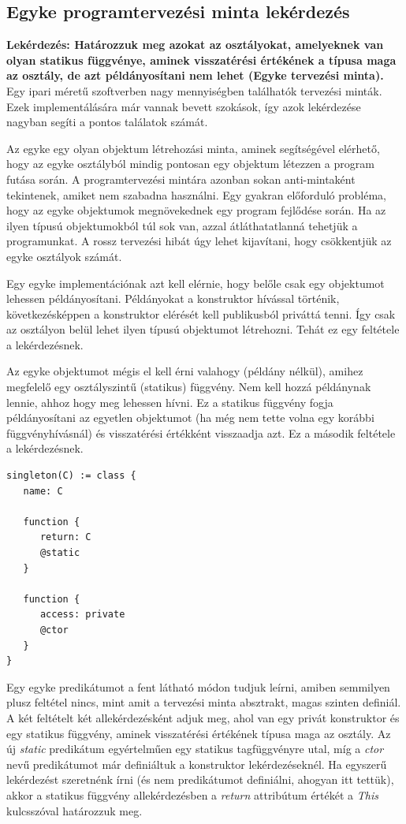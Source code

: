 \documentclass[a4paper,12pt]{report}
\begin{document}
\subsection{Egyke programtervezési minta lekérdezés}
\textbf{Lekérdezés: Határozzuk meg azokat az osztályokat, amelyeknek van olyan statikus függvénye, aminek visszatérési értékének a típusa maga az osztály, de azt példányosítani nem lehet (Egyke tervezési minta).}
\\
Egy ipari méretű szoftverben nagy mennyiségben találhatók tervezési minták. Ezek implementálására már vannak bevett szokások, így azok lekérdezése nagyban segíti a pontos találatok számát.
\par Az egyke egy olyan objektum létrehozási minta, aminek segítségével elérhető, hogy az egyke osztályból mindig pontosan egy objektum létezzen a program futása során. A programtervezési mintára azonban sokan anti-mintaként tekintenek, amiket nem szabadna használni. Egy gyakran előforduló probléma, hogy az egyke objektumok megnövekednek egy program fejlődése során. Ha az ilyen típusú objektumokból túl sok van, azzal átláthatatlanná tehetjük a programunkat. A rossz tervezési hibát úgy lehet kijavítani, hogy csökkentjük az egyke osztályok számát.
\par Egy egyke implementációnak azt kell elérnie, hogy belőle csak egy objektumot lehessen példányosítani. Példányokat a konstruktor hívással történik, következésképpen a konstruktor elérését kell publikusból priváttá tenni. Így csak az osztályon belül lehet ilyen típusú objektumot létrehozni. Tehát ez egy feltétele a lekérdezésnek.
\par Az egyke objektumot mégis el kell érni valahogy (példány nélkül), amihez megfelelő egy osztályszintű (statikus) függvény. Nem kell hozzá példánynak lennie, ahhoz hogy meg lehessen hívni. Ez a statikus függvény fogja példányosítani az egyetlen objektumot (ha még nem tette volna egy korábbi függvényhívásnál) és visszatérési értékként visszaadja azt. Ez a második feltétele a lekérdezésnek.
\begin{verbatim}
singleton(C) := class {
   name: C
   
   function {
      return: C
      @static
   }

   function {
      access: private 
      @ctor      
   }
}
\end{verbatim}
\par Egy egyke predikátumot a fent látható módon tudjuk leírni, amiben semmilyen plusz feltétel nincs, mint amit a tervezési minta absztrakt, magas szinten definiál. A két feltételt két allekérdezésként adjuk meg, ahol van egy privát konstruktor és egy statikus függvény, aminek visszatérési értékének típusa maga az osztály. Az új \textit{static} predikátum egyértelműen egy statikus tagfüggvényre utal, míg a \textit{ctor} nevű predikátumot már definiáltuk a konstruktor lekérdezéseknél. Ha egyszerű lekérdezést szeretnénk írni (és nem predikátumot definiálni, ahogyan itt tettük), akkor a statikus függvény allekérdezésben a \textit{return} attribútum értékét a \textit{This} kulcsszóval határozzuk meg.
\end{document}
